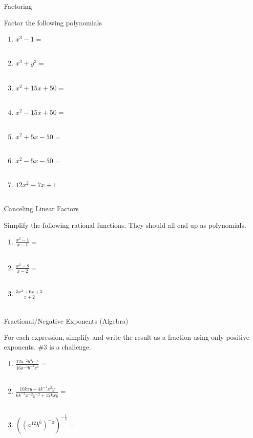 \documentclass{article}
\begin{document}
\newpage
	\centerline{\Large{ Factoring}}\vspace{12 pt}
Factor the following polynomials
\begin{enumerate}
\item $x^3-1=$ \\ \\
\item $x^3+y^3=$ \\ \\
\item $x^2 + 15x + 50=$ \\ \\
\item $x^2 - 15x + 50=$ \\ \\
\item $x^2 + 5x - 50=$ \\ \\
\item $x^2 - 5x - 50=$ \\ \\
\item $12x^2 - 7x + 1=$ \\ \\
\end{enumerate}

	\centerline{\Large{ Canceling Linear Factors}}\vspace{12 pt}
	Simplify the following rational functions. They should all end up as polynomials. 
\begin{enumerate}
\item $ \frac{x^2-1}{x-1}=$ \\ \\
\item $ \frac{x^3-8}{x-2}=$ \\ \\
\item $ \frac{3x^2 + 6x + 3}{x+2}=$ \\ \\
\end{enumerate}

	
	\centerline{\Large{ Fractional/Negative Exponents (Algebra)}}\vspace{12 pt}
For each expression, simplify and write the result as a fraction using only positive exponents. \#3 is a challenge. 
\begin{enumerate}
\item $ \frac{12a^{-2}b^3c^{-4}}{16a^{-3}b^{-1}c^3} =$ \\ \\ 
\item $ \frac{10kxy - 4k^{-1}x^2y}{6k^{-2}x^{-2}y^{-2} + 12kxy} =$ \\ \\ 
\item $\left((a^{12} b^6)^{-\frac{1}{2}} \right)^{-\frac{1}{3}} =$ \\ \\ 
\end{enumerate}



    

	
\end{document}
